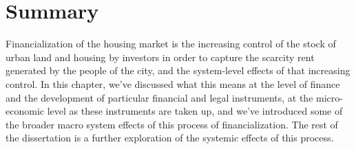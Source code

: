 





\section{Summary} 
Financialization of the housing market is the increasing control of the stock of urban land and housing by investors in order to capture the scarcity rent generated by the people of the city, and the system-level effects of that increasing control.  In this chapter, we've discussed what this means at the level of finance and the development of particular financial and legal instruments, at the micro-economic level as these instruments are taken up, and we've introduced some of the broader macro system effects of this process of financialization. The rest of the dissertation is a further exploration of the systemic effects of this process. 




